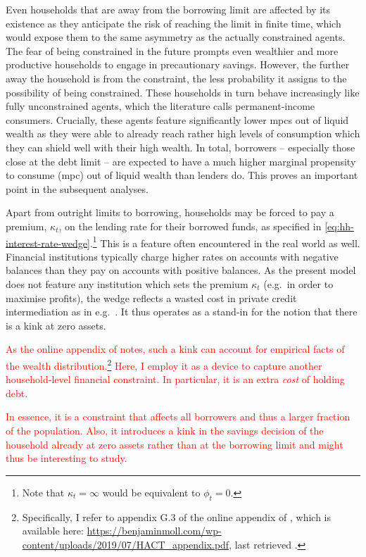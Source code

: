 \documentclass[12pt]{article} %
\numberwithin{equation}{section} %
\begin{document}
Even households that are away from the borrowing limit are affected by its existence as they anticipate the risk of reaching the limit in finite time, which would expose them to the same asymmetry as the actually constrained agents. The fear of being constrained in the future prompts even wealthier and more productive households to engage in precautionary savings. However, the further away the household is from the constraint, the less probability it assigns to the possibility of being constrained. These households in turn behave increasingly like fully unconstrained agents, which the literature calls permanent-income consumers. Crucially, these agents feature significantly lower \Gls{mpc}s out of liquid wealth as they were able to already reach rather high levels of consumption which they can shield well with their high wealth. In total, borrowers -- especially those close at the debt limit -- are expected to have a much higher marginal propensity to consume (\Gls{mpc}) out of liquid wealth than lenders do. This proves an important point in the subsequent analyses.

Apart from outright limits to borrowing, households may be forced to pay a premium, $\kappa_t$, on the lending rate for their borrowed funds, as specified in \eqref{eq:hh-interest-rate-wedge}.\footnote{Note that $\kappa_t = \infty$ would be equivalent to $\phi_t=0$.} This is a feature often encountered in the real world as well. Financial institutions typically charge higher rates on accounts with negative balances than they pay on accounts with positive balances. As the present model does not feature any institution which sets the premium $\kappa_t$ (e.g.~in order to maximise profits), the wedge reflects a wasted cost in private credit intermediation as in e.g.~\textcite{bayer2023}. It thus operates as a stand-in for the notion that there is a kink at zero assets.

\textcolor{red}{As the online appendix of \textcite{achdou2022} notes, such a kink can account for empirical facts of the wealth distribution.\footnote{Specifically, I refer to appendix G.3 of the online appendix of \textcite{achdou2022}, which is available here: \url{https://benjaminmoll.com/wp-content/uploads/2019/07/HACT_appendix.pdf}, last retrieved .} Here, I employ it as a device to capture another household-level financial constraint. In particular, it is an extra \textit{cost} of holding debt.}

\textcolor{red}{In essence, it is a constraint that affects all borrowers and thus a larger fraction of the population. Also, it introduces a kink in the savings decision of the household already at zero assets rather than at the borrowing limit and might thus be interesting to study.}
\end{document}
